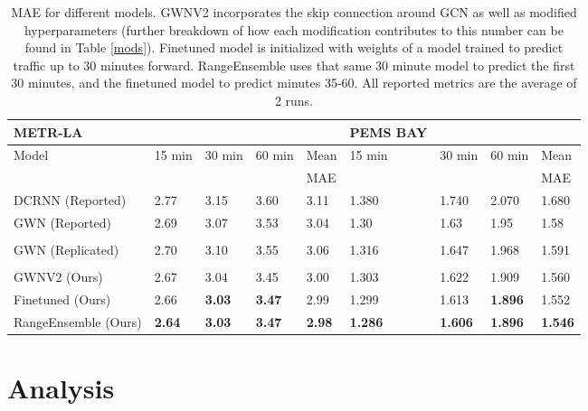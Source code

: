 \documentclass[10pt]{article}
\begin{document}
\begin{table}[!htbp]
\centering
\begin{tabular}{@{}lllll|llll@{}}
\toprule
METR-LA              &         &         &         &         & PEMS BAY        &         &         &          \\ \midrule
Model                & 15 min & 30 min & 60 min & Mean & 15 min & 30 min & 60 min & Mean \\
 & & & & MAE & & & & MAE \\
\midrule
DCRNN (Reported)     & 2.77    & 3.15    & 3.60    & 3.11     & 1.380   & 1.740   & 2.070   & 1.680    \\
GWN (Reported)       & 2.69    & 3.07    & 3.53    & 3.04     & 1.30    & 1.63    & 1.95    & 1.58     \\
                     &         &         &         &          &         &         &         &          \\
GWN (Replicated)     & 2.70    & 3.10    & 3.55    & 3.06     & 1.316   & 1.647   & 1.968   & 1.591    \\
                     &         &         &         &          &         &         &         &          \\
GWNV2 (Ours)  & 2.67    & 3.04    & 3.45    & 3.00     & 1.303   & 1.622   & 1.909   & 1.560    \\
Finetuned (Ours)     & 2.66    & \textbf{3.03}    & \textbf{3.47}    & 2.99     & 1.299   & 1.613   & \textbf{1.896}   & 1.552    \\
RangeEnsemble (Ours) & \textbf{2.64  }  &\textbf{3.03}    & \textbf{3.47}    &\textbf{2.98  }   & \textbf{1.286}   & \textbf{1.606}   & \textbf{1.896}   & \textbf{1.546}    \\ \bottomrule
\end{tabular}
\caption{MAE for different models. GWNV2 incorporates the skip connection around GCN as well as modified hyperparameters (further breakdown of how each modification contributes to this number can be found in Table \ref{mods}). Finetuned model is initialized with weights of a model trained to predict traffic up to 30 minutes forward. RangeEnsemble uses that same 30 minute model to predict the first 30 minutes, and the finetuned model to predict minutes 35-60. All reported metrics are the average of 2 runs.}
\label{results}
\end{table}

\section{Analysis}
\end{document}
